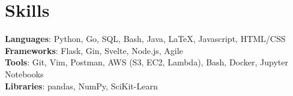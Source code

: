 \documentclass[letterpaper,11pt]{article}
\begin{document}
%
\section{Skills}
 \begin{itemize}[leftmargin=0.15in, label={}]
    \small{\item{
     \textbf{Languages}{: Python, Go, SQL, Bash, Java, \LaTeX, Javascript, HTML/CSS} \\
     \textbf{Frameworks}{: Flask, Gin, Svelte, Node.js, Agile} \\
     \textbf{Tools}{: Git, Vim, Postman, AWS (S3, EC2, Lambda), Bash, Docker, Jupyter Notebooks} \\
     \textbf{Libraries}{: pandas, NumPy, SciKit-Learn}
    }}
 \end{itemize}

\end{document}

